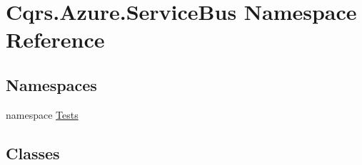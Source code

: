 \hypertarget{namespaceCqrs_1_1Azure_1_1ServiceBus}{}\section{Cqrs.\+Azure.\+Service\+Bus Namespace Reference}
\label{namespaceCqrs_1_1Azure_1_1ServiceBus}
\subsection*{Namespaces}
\begin{DoxyCompactItemize}
\item 
namespace \hyperlink{namespaceCqrs_1_1Azure_1_1ServiceBus_1_1Tests}{Tests}
\end{DoxyCompactItemize}
\subsection*{Classes}
